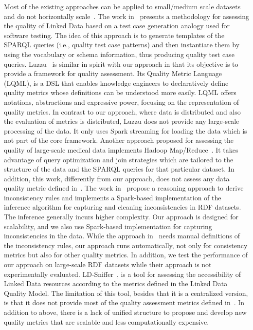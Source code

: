 Most of the existing approaches can be applied to small/medium scale datasets and do not horizontally scale~\cite{debattista2016luzzu,KontokostasWAHLCZ14}. 
The work in~\cite{KontokostasWAHLCZ14} presents a methodology for assessing the quality of Linked Data based on a test case generation analogy used for software testing. 
The idea of this approach is to generate templates of the \gls{SPARQL} queries (i.e., quality test case patterns) and then instantiate them by using the vocabulary or schema information, thus producing quality test case queries. 
Luzzu~\cite{debattista2016luzzu} is similar in spirit with our approach in that its objective is to provide a framework for quality assessment.
Its Quality Metric Language (LQML), is a \gls{DSL} that enables knowledge engineers to declaratively define quality metrics whose definitions can be understood more easily. 
LQML offers notations, abstractions and expressive power, focusing on the representation of quality metrics.
In contrast to our approach, where data is distributed and also the evaluation of metrics is distributed, Luzzu does not provide any large-scale processing of the data. 
It only uses Spark streaming for loading the data which is not part of the core framework. 
Another approach proposed for assessing the quality of large-scale medical data implements Hadoop Map/Reduce~\cite{BonnerMKBTMCA15}. 
It takes advantage of query optimization and join strategies which are tailored to the structure of the data and the \gls{SPARQL} queries for that particular dataset. In addition, this work, differently from our approach, does not assess any data quality metric defined in~\cite{zaveri2015quality}.
The work in~\cite{BenbernouO17} propose a reasoning approach to derive inconsistency rules and implements a Spark-based implementation of the inference algorithm for capturing and cleaning inconsistencies in \gls{RDF} datasets. 
The inference generally incurs higher complexity. Our approach is designed for scalability, and we also use Spark-based implementation for capturing inconsistencies in the data.
While the approach in~\cite{BenbernouO17} needs manual definitions of the inconsistency rules, our approach runs automatically, not only for consistency metrics but also for other quality metrics. 
In addition, we test the performance of our approach on large-scale \gls{RDF} datasets while their approach is not experimentally evaluated. 
LD-Sniffer~\cite{Mihindukulasooriya2016LDSA}, is a tool for assessing the accessibility of Linked Data resources according to the metrics defined in the Linked Data Quality Model. 
The limitation of this tool, besides that it is a centralized version, is that it does not provide most of the quality assessment metrics defined in~\cite{zaveri2015quality}. 
In addition to above, there is a lack of unified structure to propose and develop new quality metrics that are scalable and less computationally expensive.

